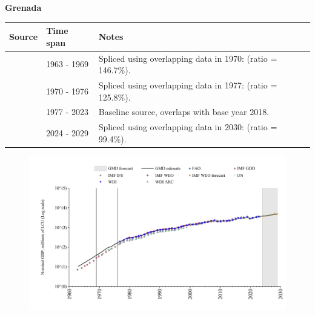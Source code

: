 \documentclass[12pt,a4paper,landscape]{article}
\begin{document}
\begin{adjustbox}{max totalsize={\paperwidth}{\paperheight},center}
\begin{minipage}[t][\textheight][t]{\textwidth}
\vspace*{0.5cm}
{}
\begin{center}
{\Large\bfseries Grenada}
\end{center}
\vspace{0.5cm}
\begin{table}[H]
\centering
\small
\begin{tabular}{|l|l|l|}
\hline
\textbf{Source} & \textbf{Time span} & \textbf{Notes} \\
\hline
\rowcolor{white}\cite{IMF_GDD}& 1963 - 1969 &Spliced using overlapping data in 1970: (ratio = 146.7\%).\\
\rowcolor{lightgray}\cite{UN}& 1970 - 1976 &Spliced using overlapping data in 1977: (ratio = 125.8\%).\\
\rowcolor{white}\cite{WDI}& 1977 - 2023 &Baseline source, overlaps with base year 2018.\\
\rowcolor{lightgray}\cite{IMF_WEO_forecast}& 2024 - 2029 &Spliced using overlapping data in 2030: (ratio = 99.4\%).\\
\hline
\end{tabular}
\end{table}
\begin{figure}[H]
\centering
\includegraphics[width=\textwidth,height=0.6\textheight,keepaspectratio]{graphs/GRD_nGDP.pdf}
\end{figure}
\end{minipage}
\end{adjustbox}
\end{document}

